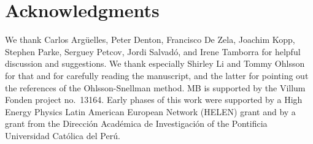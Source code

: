 \documentclass[final,5p,times,twocolumn]{elsarticle}
\begin{document}
\section*{Acknowledgments}

We thank Carlos Arg\"uelles, Peter Denton, Francisco De Zela, Joachim Kopp, Stephen Parke, Serguey Petcov, Jordi Salvad\'o, and Irene Tamborra for helpful discussion and suggestions.  We thank especially Shirley Li and Tommy Ohlsson for that and for carefully reading the manuscript, and the latter for pointing out the references of the Ohlsson-Snellman method.  MB is supported by the Villum Fonden project no.~13164.  Early phases of this work were supported by a High Energy Physics Latin American European Network (HELEN) grant and by a grant from the Direcci\'on Acad\'emica de Investigaci\'on of the Pontificia Universidad Cat\'olica del Per\'u. 

\newpage


% 
% 
\end{document}

